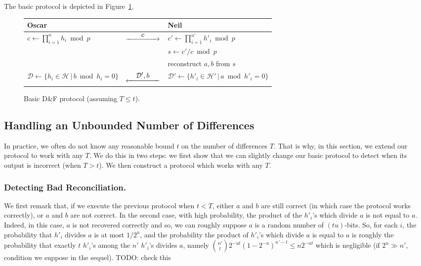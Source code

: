 \documentclass[twoside,envcountsame,runningheads]{llncs}
\newcommand{\Set}{\mathcal{H}}
\newcommand{\SetD}{\mathcal{D}}
\newcommand{\df}{D\&F\xspace}
\newcommand{\Rflow}[1]{\stackrel{\displaystyle #1}{\hbox to 5em{\rightarrowfill}}}
\newcommand{\Lflow}[1]{\stackrel{\displaystyle #1}{\hbox to 5em{\leftarrowfill}}}
\begin{document}
The basic protocol is depicted in Figure~\ref{fig:basic-df}.

\begin{figure}[t]
\centering
\begin{tabular}{p{}cp{}}
\toprule
\textbf{Oscar}                    &                        & \textbf{Neil}\\
\midrule
$c \gets \prod_{i=1}^n h_i \bmod p$        & $\Rflow{c}$               & $c' \gets \prod_{i=1}^{n'} h'_i \bmod p$ \\
                                  &                        & $s \gets c'/c \bmod p$ \\
                                  &                        & reconstruct  $a,b$ from $s$\\
$\SetD \gets \{ h_i \in \Set \,|\, b \bmod h_i = 0 \}$  & $\Lflow{\SetD',b}$  & $\SetD' \gets \{ h'_i \in \Set' \,|\, a \bmod h'_i = 0 \}$ \\
\bottomrule
\end{tabular}\vspace{-0.25cm} %
\caption{Basic \df protocol (assuming $T \le t$).}
\label{fig:basic-df}
\end{figure}

\subsection{Handling an Unbounded Number of Differences}

In practice, we often do not know any reasonable bound $t$ on the number of differences $T$.
That is why, in this section, we extend our protocol to work with any $T$.
We do this in two steps: we first show that we can slightly change our basic protocol to detect when its output is incorrect (when $T > t$).
We then construct a protocol which works with any $T$.

\subsubsection{Detecting Bad Reconciliation.}
We first remark that, if we execute the previous protocol when $t < T$, either $a$ and $b$ are still correct (in which case the protocol works correctly), or $a$ and $b$ are not correct.
In the second case, with high probability, the product of the $h'_i$'s which divide $a$ is not equal to $a$.
Indeed, in this case, $a$ is not recovered correctly and so, we can roughly suppose $a$ is a random number of $(tu)$-bits. So, for each $i$, the probability that $h'_i$ divides $a$ is at most $1/2^u$, and the probability the product of $h'_i$'s which divide $a$ is equal to $a$ is roughly the probability that exactly $t$ $h'_i$'s among the $n'$ $h'_i$'s divides $a$, namely $\binom{n'}{t} 2^{-ut} (1-2^{-u})^{n'-t} \le n 2^{-ut}$ which is negligible (if $2^{u} \gg n'$, condition we suppose in the sequel).
TODO: check this
\end{document}
